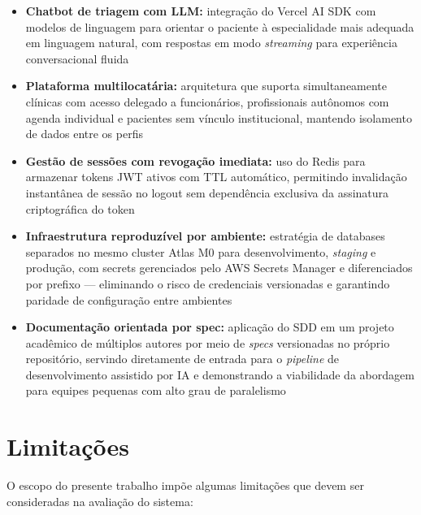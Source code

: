 \begin{itemize}
  \item \textbf{Chatbot de triagem com LLM:} integração
        do Vercel AI SDK com modelos de linguagem para
        orientar o paciente à especialidade mais
        adequada em linguagem natural, com respostas
        em modo \textit{streaming} para experiência
        conversacional fluida

  \item \textbf{Plataforma multilocatária:} arquitetura
        que suporta simultaneamente clínicas com acesso
        delegado a funcionários, profissionais autônomos
        com agenda individual e pacientes sem vínculo
        institucional, mantendo isolamento de dados
        entre os perfis

  \item \textbf{Gestão de sessões com revogação
        imediata:} uso do Redis para armazenar tokens
        JWT ativos com TTL automático, permitindo
        invalidação instantânea de sessão no logout
        sem dependência exclusiva da assinatura
        criptográfica do token

  \item \textbf{Infraestrutura reproduzível por
        ambiente:} estratégia de databases separados
        no mesmo cluster Atlas M0 para desenvolvimento,
        \textit{staging} e produção, com secrets
        gerenciados pelo AWS Secrets Manager e
        diferenciados por prefixo — eliminando o risco
        de credenciais versionadas e garantindo
        paridade de configuração entre ambientes

  \item \textbf{Documentação orientada por spec:}
        aplicação do SDD em um projeto acadêmico de
        múltiplos autores por meio de \textit{specs}
        versionadas no próprio repositório, servindo
        diretamente de entrada para o \textit{pipeline}
        de desenvolvimento assistido por IA e
        demonstrando a viabilidade da abordagem para
        equipes pequenas com alto grau de paralelismo
\end{itemize}

\section{Limitações}
\label{sec:limitations}

O escopo do presente trabalho impõe algumas limitações
que devem ser consideradas na avaliação do sistema:

